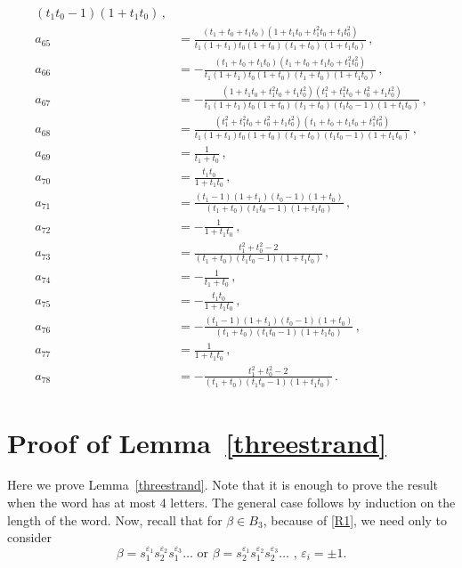 \documentclass[12pt,reqno]{amsart}
\theoremstyle{definition}
\begin{document}
\begin{tiny}
\begin{align*}
{(t_1 t_0 - 1) (1 + t_1 t_0)} \,,
\\
a_{65} & = \frac{(t_1 + t_0 + t_1 t_0) (1 + t_1 t_0 + t_1^2 t_0 + t_1 t_0^2)}{
t_1 (1 + t_1) t_0 (1 + t_0) (t_1 + t_0) (1 + t_1 t_0)} \,,
\\
a_{66} & = -\frac{(t_1 + t_0 + t_1 t_0) (t_1 + t_0 + t_1 t_0 + t_1^2 t_0^2)}{
t_1 (1 + t_1) t_0 (1 + t_0) (t_1 + t_0) (1 + t_1 t_0)} \,,
\\
a_{67} & = -\frac{(1 + t_1 t_0 + t_1^2 t_0 + t_1 t_0^2) (t_1^2 + t_1^2 t_0 + t_0^2
+ t_1 t_0^2)}{t_1 (1 + t_1) t_0 (1 + t_0) (t_1 + t_0) (t_1 t_0 - 1) (1 + t_1 t_0)} \,,
\\
a_{68} & = \frac{(t_1^2 + t_1^2 t_0 + t_0^2 + t_1 t_0^2) (t_1 + t_0 + t_1 t_0
+ t_1^2 t_0^2)}{t_1 (1 + t_1) t_0 (1 + t_0) (t_1 + t_0) (t_1 t_0 - 1)
(1 + t_1 t_0)} \,,
\\
a_{69} & = \frac{1}{t_1 + t_0} \,,
\\
a_{70} & = \frac{t_1 t_0}{1 + t_1 t_0} \,,
\\
a_{71} & = \frac{(t_1 - 1) (1 + t_1) (t_0 - 1) (1 + t_0)}{(t_1 + t_0) (t_1 t_0 - 1)
(1 + t_1 t_0)} \,,
\\
a_{72} & = -\frac{1}{1 + t_1 t_0} \,,
\\
a_{73} & = \frac{t_1^2 + t_0^2 - 2}{(t_1 + t_0) (t_1 t_0 - 1) (1 + t_1 t_0)} \,,
\\
a_{74} & = -\frac{1}{t_1 + t_0} \,,
\\
a_{75} & = -\frac{t_1 t_0}{1 + t_1 t_0} \,,
\\
a_{76} & = -\frac{(t_1 - 1) (1 + t_1) (t_0 - 1) (1 + t_0)}{(t_1 + t_0)
(t_1 t_0 - 1) (1 + t_1 t_0)} \,,
\\
a_{77} & = \frac{1}{1 + t_1 t_0} \,,
\\
a_{78} & = -\frac{t_1^2 + t_0^2 - 2}{(t_1 + t_0) (t_1 t_0 - 1) (1 + t_1 t_0)} \,.
\end{align*}
\end{tiny}


\section{Proof of Lemma~\ref{threestrand}}
\label{proofthreestrand}

Here we prove Lemma~\ref{threestrand}. Note that it is enough to prove the result
when the word has at most 4 letters. The general case follows by induction on the
length of the word. Now, recall that for $\beta \in B_3$, because of \eqref{R1},
we need only to consider 
$$
\beta = s_1^{\varepsilon_1} s_2^{\varepsilon_2} s_1^{\varepsilon_3} \ldots \text{ or }
\beta = s_2^{\varepsilon_1} s_1^{\varepsilon_2} s_2^{\varepsilon_3} \ldots \text{ , }
\varepsilon_i = \pm 1.
$$
\end{document}
